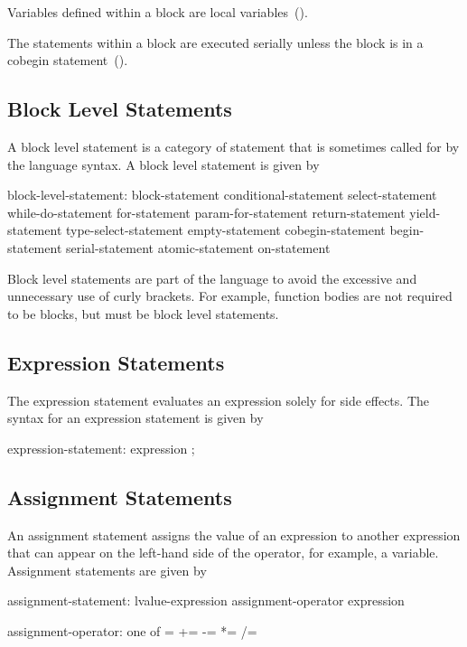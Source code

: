 Variables defined within a block are local
variables~().

The statements within a block are executed serially unless the block
is in a cobegin statement~().

\subsection{Block Level Statements}
\label{Block_Level_Statements}

A block level statement is a category of statement that is sometimes
called for by the language syntax. A block level statement is given by
\begin{syntax}
block-level-statement:
  block-statement
  conditional-statement
  select-statement
  while-do-statement
  for-statement
  param-for-statement
  return-statement
  yield-statement
  type-select-statement
  empty-statement
  cobegin-statement
  begin-statement
  serial-statement
  atomic-statement
  on-statement
\end{syntax}

Block level statements are part of the language to avoid the excessive
and unnecessary use of curly brackets.  For example, function bodies
are not required to be blocks, but must be block level statements.

\subsection{Expression Statements}
\label{Expression_Statements}

The expression statement evaluates an expression solely for side
effects. The syntax for an expression statement is given by
\begin{syntax}
expression-statement:
  expression ;
\end{syntax}

\subsection{Assignment Statements}
\label{Assignment_Statements}

An assignment statement assigns the value of an expression to another
expression that can appear on the left-hand side of the operator, for
example, a variable.  Assignment statements are given by

\begin{syntax}
assignment-statement:
  lvalue-expression assignment-operator expression

assignment-operator: one of
   = += -= *= /= %
\end{syntax}

